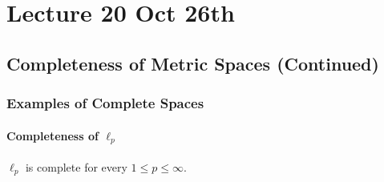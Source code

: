 \documentclass[notoc,notitlepage]{tufte-book}
\begin{document}




\chapter{Lecture 20 Oct 26th}%
\label{chp:lecture_20_oct_26th}

\section{Completeness of Metric Spaces (Continued)}%
\label{sec:completeness_of_metric_spaces_continued}

\subsection{Examples of Complete Spaces}%
\label{sub:examples_of_complete_spaces}

\subsubsection{Completeness of $\ell_p$}%
\label{ssub:completeness_of_ell_p_}

\begin{thm}\label{thm:completeness_of_ell_p_}
  $\ell_p$ is complete for every $1 \leq p \leq \infty$.
\end{thm}
\end{document}
